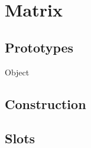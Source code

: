 
\section{Matrix}

\subsection{Prototypes}
\begin{refObjects}
\item[Object]
\end{refObjects}

\subsection{Construction}

\subsection{Slots}

